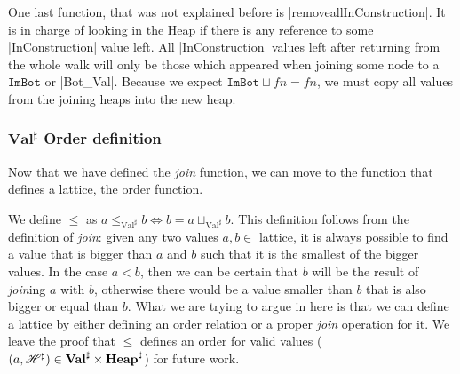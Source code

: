 One last function, that was not explained before is
\pycode|removeallInConstruction|. It is in charge of looking in the Heap
if there is any reference to some \pycode|InConstruction| value left.
All \pycode|InConstruction| values left after returning from the whole
walk will only be those which appeared when joining some node to a
\(\texttt{ImBot}\) or \pycode|Bot_Val|. Because we expect
\(\texttt{ImBot} \sqcup fn = fn\), we must copy all values from the joining
heaps into the new heap.




\subsubsection*{\(\mathbf{Val}^\sharp\) Order definition}

Now that we have defined the \emph{join} function, we can move to the
function that defines a lattice, the order function.

We define \(\le\) as \(a \le_{\text{Val}^\sharp} b \iff b = a \sqcup_{\text{Val}^\sharp} b\).
This definition follows from the definition of \emph{join}: given any two values
\(a,b \in\) lattice, it is always possible to find a value that is bigger than \(a\) and
\(b\) such that it is the smallest of the bigger values. In the case \(a < b\), then we
can be certain that \(b\) will be the result of \emph{join}ing \(a\) with \(b\), otherwise
there would be a value smaller than \(b\) that is also bigger or equal than \(b\). What we
are trying to argue in here is that we can define a lattice by either defining an order
relation or a proper \emph{join} operation for it. We leave the proof that \(\le\)
defines an order for valid values
(\((a, \mathscr{H}^\sharp) \in \mathbf{Val}^\sharp \times \mathbf{Heap}^\sharp\)) for future
work.


